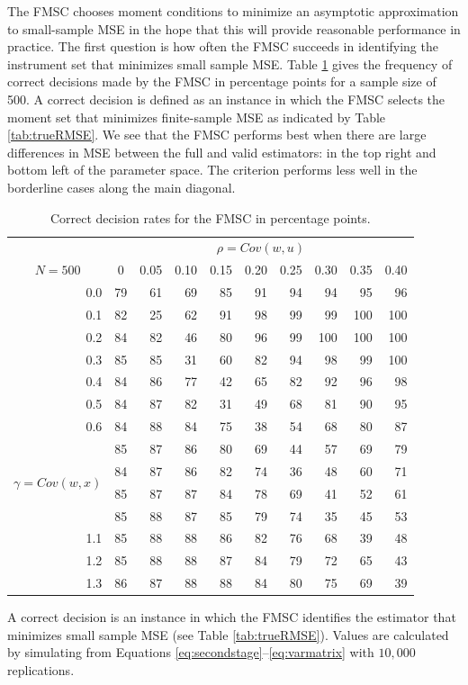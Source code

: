 \documentclass[12pt]{article}
\theoremstyle{definition}
\begin{document}
The FMSC chooses moment conditions to minimize an asymptotic approximation to small-sample MSE in the hope that this will provide reasonable performance in practice. The first question is how often the FMSC succeeds in identifying the instrument set that minimizes small sample MSE. Table \ref{tab:correctFMSC} gives the frequency of correct decisions made by the FMSC in percentage points for a sample size of 500. A correct decision is defined as an instance in which the FMSC selects the moment set that minimizes finite-sample MSE as indicated by Table \ref{tab:trueRMSE}. We see that the FMSC performs best when there are large differences in MSE between the full and valid estimators: in the top right and bottom left of the parameter space. The criterion performs less well in the borderline cases along the main diagonal.
%
\begin{table}[!tbp]
\caption{Correct decision rates for the FMSC in percentage points.}
\label{tab:correctFMSC}
\small
 \begin{center}
 \begin{tabular}{r|rrrrrrrrr}\hline\hline
&\multicolumn{9}{c}{$\rho = Cov(w,u)$}\\
\multicolumn{1}{c|}{$N = 500$}&\multicolumn{1}{c}{0}&\multicolumn{1}{c}{0.05}&\multicolumn{1}{c}{0.10}&\multicolumn{1}{c}{0.15}&\multicolumn{1}{c}{0.20}&\multicolumn{1}{c}{0.25}&\multicolumn{1}{c}{0.30}&\multicolumn{1}{c}{0.35}&\multicolumn{1}{c}{0.40}\tabularnewline
\hline
0.0&79&61&69&85&91&94& 94& 95& 96\tabularnewline
0.1&82&25&62&91&98&99& 99&100&100\tabularnewline
0.2&84&82&46&80&96&99&100&100&100\tabularnewline
0.3&85&85&31&60&82&94& 98& 99&100\tabularnewline
0.4&84&86&77&42&65&82& 92& 96& 98\tabularnewline
0.5&84&87&82&31&49&68& 81& 90& 95\tabularnewline
0.6&84&88&84&75&38&54& 68& 80& 87\tabularnewline
\multirow{4}{5mm}{\begin{sideways}\parbox{1mm}{$\gamma\;$=$\;Cov(w,x)$}\end{sideways}}
0.7&85&87&86&80&69&44& 57& 69& 79\tabularnewline
0.8&84&87&86&82&74&36& 48& 60& 71\tabularnewline
0.9&85&87&87&84&78&69& 41& 52& 61\tabularnewline
1.0&85&88&87&85&79&74& 35& 45& 53\tabularnewline
1.1&85&88&88&86&82&76& 68& 39& 48\tabularnewline
1.2&85&88&88&87&84&79& 72& 65& 43\tabularnewline
1.3&86&87&88&88&84&80& 75& 69& 39\tabularnewline
\hline
\end{tabular}
\begin{tablenotes}
\footnotesize
\item A correct decision is an instance in which the FMSC identifies the estimator that minimizes small sample MSE (see Table \ref{tab:trueRMSE}). Values are calculated by simulating from Equations \ref{eq:secondstage}--\ref{eq:varmatrix} with $10,000$ replications.
\end{tablenotes}
\end{center}

\end{table}
\end{document}
